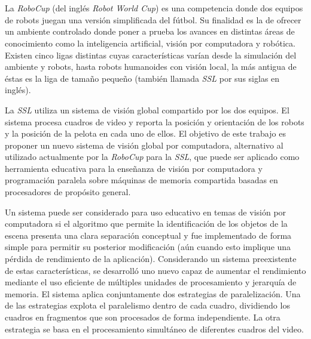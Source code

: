 \ \\
\ \\
\label{pagresum}
\\
\ \\
\ \\

\ \\

\ \\

La \emph{RoboCup} (del inglés \emph{Robot World Cup}) es una competencia donde
dos equipos de robots juegan una versión simplificada del fútbol. Su finalidad
es la de ofrecer un ambiente controlado donde poner a prueba los avances en
distintas áreas de conocimiento como la inteligencia artificial, visión por
computadora y robótica. Existen cinco ligas distintas cuyas características
varían desde la simulación del ambiente y robots, hasta robots humanoides con
visión local, la más antigua de éstas es la liga de tamaño pequeño (también
llamada \emph{SSL} por sus siglas en inglés).

La \emph{SSL} utiliza un sistema de visión global compartido por los dos
equipos.  El sistema procesa cuadros de video y reporta la posición y
orientación de los robots y la posición de la pelota en cada uno de ellos. El
objetivo de este trabajo es proponer un nuevo sistema de visión global por
computadora, alternativo al utilizado actualmente por la \emph{RoboCup} para la
\emph{SSL}, que puede ser aplicado como herramienta educativa para la enseñanza
de visión por computadora y programación paralela sobre máquinas de memoria
compartida basadas en procesadores de propósito general.

Un sistema puede ser considerado para uso educativo en temas de visión por
computadora si el algoritmo que permite la identificación de los objetos de la
escena presenta una clara separación conceptual y fue implementado de forma
simple para permitir su posterior modificación (aún cuando esto implique una
pérdida de rendimiento de la aplicación). Considerando un sistema preexistente
de estas características, se desarrolló uno nuevo capaz de aumentar el
rendimiento mediante el uso eficiente de múltiples unidades de procesamiento y
jerarquía de memoria. El sistema aplica conjuntamente dos estrategias de
paralelización. Una de las estrategias explota el paralelismo dentro de cada
cuadro, dividiendo los cuadros en fragmentos que son procesados de forma
independiente. La otra estrategia se basa en el procesamiento simultáneo de
diferentes cuadros del video.

